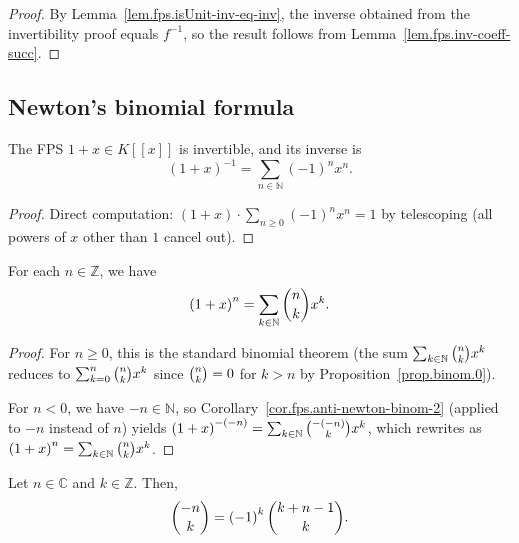\begin{proof}
By Lemma~\ref{lem.fps.isUnit-inv-eq-inv}, the inverse obtained from
the invertibility proof equals $f^{-1}$,
so the result follows from Lemma~\ref{lem.fps.inv-coeff-succ}.
\end{proof}

\subsection{Newton's binomial formula}

\begin{proposition}
\label{prop.fps.invertible.1+x}
\leantarget
\leanok
The FPS $1+x\in K[[x]]$ is invertible, and its inverse is%
\[
\left(1+x\right)^{-1}=\sum_{n\in\mathbb{N}}\left(-1\right)^{n}x^{n}.
\]
\end{proposition}

\begin{proof}
\leanok
Direct computation: $(1+x)\cdot\sum_{n\geq 0}(-1)^n x^n = 1$ by telescoping
(all powers of $x$ other than $1$ cancel out).
\end{proof}

\begin{theorem}
\label{thm.fps.newton-binom}
\leantarget
\leanok
For each $n\in\mathbb{Z}$, we have%
\[
\left(1+x\right)^{n}=\sum_{k\in\mathbb{N}}\dbinom{n}{k}x^{k}.
\]
\end{theorem}

\begin{proof}
\leanok
For $n\geq 0$, this is the standard binomial theorem (the sum
$\sum_{k\in\mathbb{N}}\dbinom{n}{k}x^{k}$ reduces to $\sum_{k=0}^{n}\dbinom{n}{k}x^{k}$
since $\dbinom{n}{k}=0$ for $k > n$ by Proposition~\ref{prop.binom.0}).

For $n<0$, we have $-n\in\mathbb{N}$, so Corollary~\ref{cor.fps.anti-newton-binom-2}
(applied to $-n$ instead of $n$) yields
$\left(1+x\right)^{-(-n)} = \sum_{k\in\mathbb{N}}\dbinom{-(-n)}{k}x^k$,
which rewrites as $\left(1+x\right)^n = \sum_{k\in\mathbb{N}}\dbinom{n}{k}x^k$.
\end{proof}

\begin{theorem}
\label{thm.binom.upneg-n}
\leantarget
\leanok
Let $n\in\mathbb{C}$ and $k\in\mathbb{Z}$. Then,%
\[
\dbinom{-n}{k}=\left(-1\right)^{k}\dbinom{k+n-1}{k}.
\]
\end{theorem}

